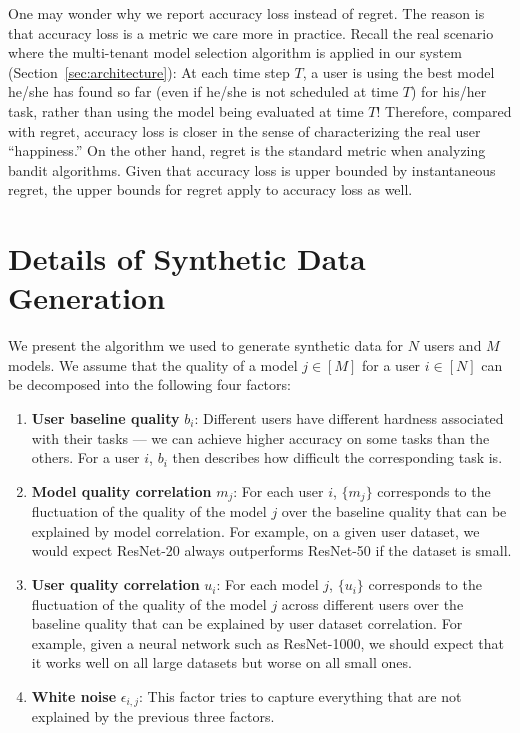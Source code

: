 \documentclass[letterpaper]{vldb}
\begin{document}
One may wonder why we report accuracy loss instead of regret.
The reason is that accuracy loss is a metric we care more in practice.
Recall the real scenario where the multi-tenant model selection algorithm is applied in our system (Section~\ref{sec:architecture}): At each time step $T$, a user is using the best model he/she has found so far (even if he/she is not scheduled at time $T$) for his/her task, rather than using the model being evaluated at time $T$!
Therefore, compared with regret, accuracy loss is closer in the sense of characterizing the real user ``happiness.''
On the other hand, regret is the standard metric when analyzing bandit algorithms.
Given that accuracy loss is upper bounded by instantaneous regret, the upper bounds for regret apply to accuracy loss as well.%


\section{Details of Synthetic Data Generation}\label{sec:appendix:synthetic}

We present the algorithm we used to generate synthetic data for $N$ users and $M$ models.
We assume that the quality of a model $j\in[M]$ for a user $i\in[N]$ can be decomposed into the following four factors:

\vspace{-0.5em}
\begin{enumerate}
\item {\bf User baseline quality} $b_i$: Different users have different
      hardness associated with their tasks --- we can achieve higher accuracy on some tasks than the others.
      For a user $i$, $b_i$ then describes how difficult the corresponding task is.
\vspace{-0.5em}
\item {\bf Model quality correlation} $m_j$: For each user $i$, $\{m_j\}$ corresponds to the fluctuation of the quality of the model $j$ over the baseline quality that can be explained by model correlation.
      For example, on a given user dataset, we would expect ResNet-20 always outperforms ResNet-50 if the dataset is small.
\vspace{-0.5em}
\item {\bf User quality correlation} $u_i$: For each model $j$, $\{u_i\}$ corresponds to the fluctuation of the quality of the model $j$ across different users
      over the baseline quality that can be explained by user dataset correlation.
      For example, given a neural network such as ResNet-1000, we should expect that it works well on all large datasets but worse on all small ones.
\vspace{-0.5em}
\item {\bf White noise} $\epsilon_{i,j}$: This factor tries to capture everything that are
      not explained by the previous three factors.
\end{enumerate}
\vspace{-0.5em}
\end{document}
